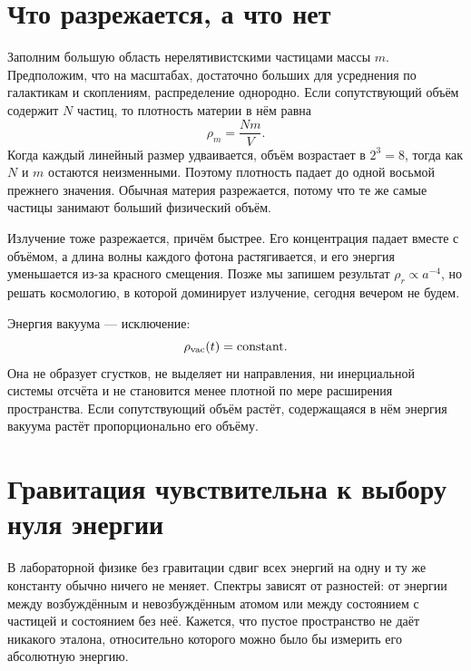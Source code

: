 \section{Что разрежается, а что нет}

Заполним большую область нерелятивистскими частицами массы \(m\). Предположим, что на масштабах, достаточно больших для усреднения по галактикам и скоплениям, распределение однородно. Если сопутствующий объём содержит \(N\) частиц, то плотность материи в нём равна
\begin{equation}
\rho_m=\frac{Nm}{V}.
\end{equation}
Когда каждый линейный размер удваивается, объём возрастает в \(2^3=8\), тогда как \(N\) и \(m\) остаются неизменными. Поэтому плотность падает до одной восьмой прежнего значения. Обычная материя разрежается, потому что те же самые частицы занимают больший физический объём.

Излучение тоже разрежается, причём быстрее. Его концентрация падает вместе с объёмом, а длина волны каждого фотона растягивается, и его энергия уменьшается из-за красного смещения. Позже мы запишем результат \(\rho_r\propto a^{-4}\), но решать космологию, в которой доминирует излучение, сегодня вечером не будем.

Энергия вакуума — исключение:
\begin{equation}
\rho_{\rm vac}(t)=\text{constant}.
\label{eq:l08-rho-vac-constant}
\end{equation}
Она не образует сгустков, не выделяет ни направления, ни инерциальной системы отсчёта и не становится менее плотной по мере расширения пространства. Если сопутствующий объём растёт, содержащаяся в нём энергия вакуума растёт пропорционально его объёму.


\section{Гравитация чувствительна к выбору нуля энергии}

В лабораторной физике без гравитации сдвиг всех энергий на одну и ту же константу обычно ничего не меняет. Спектры зависят от разностей: от энергии между возбуждённым и невозбуждённым атомом или между состоянием с частицей и состоянием без неё. Кажется, что пустое пространство не даёт никакого эталона, относительно которого можно было бы измерить его абсолютную энергию.

